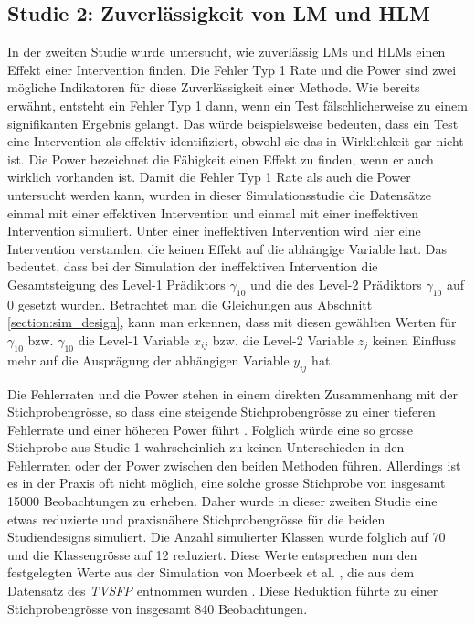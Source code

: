 \documentclass[12pt]{article}\usepackage[]{graphicx}\usepackage[]{color}
\begin{document}
\subsection{Studie 2: Zuverlässigkeit von LM und HLM}
In der zweiten Studie wurde untersucht, wie zuverlässig LMs und HLMs einen Effekt einer Intervention finden. Die Fehler Typ 1 Rate und die Power sind zwei mögliche Indikatoren für diese Zuverlässigkeit einer Methode. Wie bereits erwähnt, entsteht ein Fehler Typ 1 dann, wenn ein Test fälschlicherweise zu einem signifikanten Ergebnis gelangt. Das würde beispielsweise bedeuten, dass ein Test eine Intervention als effektiv identifiziert, obwohl sie das in Wirklichkeit gar nicht ist. Die Power bezeichnet die Fähigkeit einen Effekt zu finden, wenn er auch wirklich vorhanden ist. Damit die Fehler Typ 1 Rate als auch die Power untersucht werden kann, wurden in dieser Simulationsstudie die Datensätze einmal mit einer effektiven Intervention und einmal mit einer ineffektiven Intervention simuliert. Unter einer ineffektiven Intervention wird hier eine Intervention verstanden, die keinen Effekt auf die abhängige Variable hat. Das bedeutet, dass bei der Simulation der ineffektiven Intervention die Gesamtsteigung des Level-1 Prädiktors $\gamma_{10}$ und die des Level-2 Prädiktors $\gamma_{10}$ auf 0 gesetzt wurden. Betrachtet man die Gleichungen aus Abschnitt \ref{section:sim_design}, kann man erkennen, dass mit diesen gewählten Werten für $\gamma_{10}$ bzw. $\gamma_{10}$ die Level-1 Variable $x_{ij}$ bzw. die Level-2 Variable $z_{j}$ keinen Einfluss mehr auf die Ausprägung der abhängigen Variable $y_{ij}$ hat.

Die Fehlerraten und die Power stehen in einem direkten Zusammenhang mit der Stichprobengrösse, so dass eine steigende Stichprobengrösse zu einer tieferen Fehlerrate und einer höheren Power führt \citep{snijders2005samplesizepower}. Folglich würde eine so grosse Stichprobe aus Studie 1 wahrscheinlich zu keinen Unterschieden in den Fehlerraten oder der Power zwischen den beiden Methoden führen. Allerdings ist es in der Praxis oft nicht möglich, eine solche grosse Stichprobe von insgesamt 15000 Beobachtungen zu erheben. Daher wurde in dieser zweiten Studie eine etwas reduzierte und praxisnähere Stichprobengrösse für die beiden Studiendesigns simuliert. Die Anzahl simulierter Klassen wurde folglich auf 70 und die Klassengrösse auf 12 reduziert. Diese Werte entsprechen nun  den festgelegten Werte aus der Simulation von Moerbeek et al. \citeyearpar{MOERBEEK2003341}, die aus dem Datensatz des \textit{TVSFP} entnommen wurden \citep{FLAY1995smoking}. Diese Reduktion führte zu einer Stichprobengrösse von insgesamt 840 Beobachtungen. 
\end{document}
